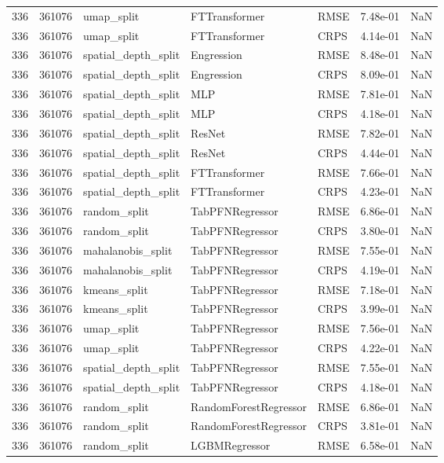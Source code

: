 \begin{tabular}{rrlllrr}
336 & 361076 & umap\_split & FTTransformer & RMSE & 7.48e-01 & NaN \\
336 & 361076 & umap\_split & FTTransformer & CRPS & 4.14e-01 & NaN \\
336 & 361076 & spatial\_depth\_split & Engression & RMSE & 8.48e-01 & NaN \\
336 & 361076 & spatial\_depth\_split & Engression & CRPS & 8.09e-01 & NaN \\
336 & 361076 & spatial\_depth\_split & MLP & RMSE & 7.81e-01 & NaN \\
336 & 361076 & spatial\_depth\_split & MLP & CRPS & 4.18e-01 & NaN \\
336 & 361076 & spatial\_depth\_split & ResNet & RMSE & 7.82e-01 & NaN \\
336 & 361076 & spatial\_depth\_split & ResNet & CRPS & 4.44e-01 & NaN \\
336 & 361076 & spatial\_depth\_split & FTTransformer & RMSE & 7.66e-01 & NaN \\
336 & 361076 & spatial\_depth\_split & FTTransformer & CRPS & 4.23e-01 & NaN \\
336 & 361076 & random\_split & TabPFNRegressor & RMSE & 6.86e-01 & NaN \\
336 & 361076 & random\_split & TabPFNRegressor & CRPS & 3.80e-01 & NaN \\
336 & 361076 & mahalanobis\_split & TabPFNRegressor & RMSE & 7.55e-01 & NaN \\
336 & 361076 & mahalanobis\_split & TabPFNRegressor & CRPS & 4.19e-01 & NaN \\
336 & 361076 & kmeans\_split & TabPFNRegressor & RMSE & 7.18e-01 & NaN \\
336 & 361076 & kmeans\_split & TabPFNRegressor & CRPS & 3.99e-01 & NaN \\
336 & 361076 & umap\_split & TabPFNRegressor & RMSE & 7.56e-01 & NaN \\
336 & 361076 & umap\_split & TabPFNRegressor & CRPS & 4.22e-01 & NaN \\
336 & 361076 & spatial\_depth\_split & TabPFNRegressor & RMSE & 7.55e-01 & NaN \\
336 & 361076 & spatial\_depth\_split & TabPFNRegressor & CRPS & 4.18e-01 & NaN \\
336 & 361076 & random\_split & RandomForestRegressor & RMSE & 6.86e-01 & NaN \\
336 & 361076 & random\_split & RandomForestRegressor & CRPS & 3.81e-01 & NaN \\
336 & 361076 & random\_split & LGBMRegressor & RMSE & 6.58e-01 & NaN \\

\end{tabular}
